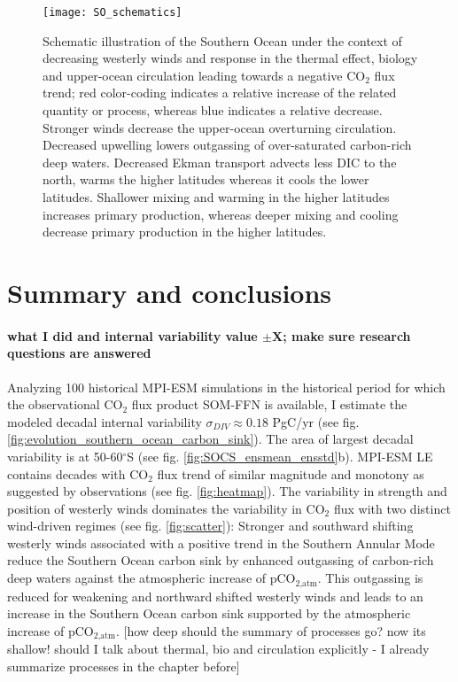 \documentclass[12pt]{article}
\begin{document}
\begin{figure}[h!]
	\centering
	\texttt{[image: SO\_schematics]}
	\caption{Schematic illustration of the Southern Ocean under the context of decreasing westerly winds and response in the thermal effect, biology and upper-ocean circulation leading towards a negative CO$_2$ flux trend; red color-coding indicates a relative increase of the related quantity or process, whereas blue indicates a relative decrease. Stronger winds decrease the upper-ocean overturning circulation. Decreased upwelling lowers outgassing of over-saturated carbon-rich deep waters. Decreased Ekman transport advects less DIC to the north, warms the higher latitudes whereas it cools the lower latitudes. Shallower mixing and warming in the higher latitudes increases primary production, whereas deeper mixing and cooling decrease primary production in the higher latitudes.}
	\label{fig:schematics_neg}
\end{figure}




\clearpage

\section{Summary and conclusions}

\paragraph{what I did and internal variability value $\pm$X; make sure research questions are answered}
Analyzing 100 historical MPI-ESM simulations in the historical period for which the observational CO$_2$ flux product SOM-FFN is available, I estimate the modeled decadal internal variability $\sigma_{DIV}\approx0.18$ PgC/yr (see fig. \ref{fig:evolution_southern_ocean_carbon_sink}). The area of largest decadal variability is at 50-60$^\circ$S (see fig. \ref{fig:SOCS_ensmean_ensstd}b). MPI-ESM LE contains decades with CO$_2$ flux trend of similar magnitude and monotony as suggested by observations \citep{landschuetzer2015} (see fig. \ref{fig:heatmap}). The variability in strength and position of westerly winds dominates the variability in CO$_2$ flux with two distinct wind-driven regimes (see fig. \ref{fig:scatter}): Stronger and southward shifting westerly winds associated with a positive trend in the Southern Annular Mode reduce the Southern Ocean carbon sink by enhanced outgassing of carbon-rich deep waters against the atmospheric increase of pCO$_{\text{2,atm}}$. This outgassing is reduced for weakening and northward shifted westerly winds and leads to an increase in the Southern Ocean carbon sink supported by the atmospheric increase of pCO$_{\text{2,atm}}$. [how deep should the summary of processes go? now its shallow! should I talk about thermal, bio and circulation explicitly - I already summarize processes in the chapter before]
\end{document}
